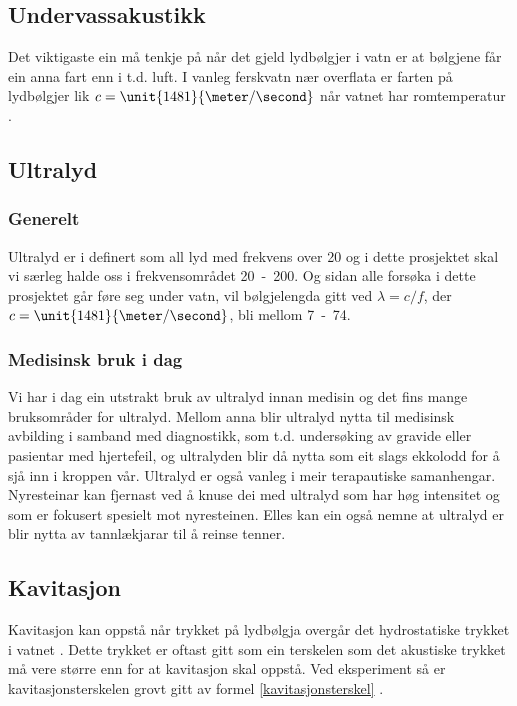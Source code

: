 \subsection{Undervassakustikk}
Det viktigaste ein må tenkje på når det gjeld lydbølgjer i vatn er at bølgjene får ein anna fart enn i t.d. luft. I vanleg ferskvatn nær overflata er farten på lydbølgjer lik $c = \unit{1481}{\meter / \second}$ når vatnet har romtemperatur \cite[s. 630]{citeulike:4412590}.
\subsection{Ultralyd}
\subsubsection*{Generelt}
Ultralyd er i \cite[s. 443]{citeulike:4412590} definert som all lyd med frekvens over \unit{20}{\kilo \hertz} og i dette prosjektet skal vi særleg halde oss i frekvensområdet \unit{20 - 200}{\kilo \hertz}. Og sidan alle forsøka i dette prosjektet går føre seg under vatn, vil bølgjelengda gitt ved $\lambda = c / f$, der $c = \unit{1481}{\meter / \second}$, bli mellom \unit{7 - 74}{\milli\meter}.

\subsubsection*{Medisinsk bruk i dag}
Vi har i dag ein utstrakt bruk av ultralyd innan medisin og det fins mange bruksområder for ultralyd. Mellom anna blir ultralyd nytta til medisinsk avbilding i samband med diagnostikk, som t.d. undersøking av gravide eller pasientar med hjertefeil, og ultralyden blir då nytta som eit slags ekkolodd for å sjå inn i kroppen vår. Ultralyd er også vanleg i meir terapautiske samanhengar. Nyresteinar kan fjernast ved å knuse dei med ultralyd som har høg intensitet og som er fokusert spesielt mot nyresteinen. Elles kan ein også nemne at ultralyd er blir nytta av tannlækjarar til å reinse tenner. 

\subsection{Kavitasjon}
Kavitasjon kan oppstå når trykket på lydbølgja overgår det hydrostatiske trykket i vatnet \cite{Kinsler:2000rc}. Dette trykket er oftast gitt som ein terskelen som det akustiske trykket må vere større enn for at kavitasjon skal oppstå. Ved eksperiment så er kavitasjonsterskelen grovt gitt av formel \eqref{kavitasjonsterskel} \cite{kavitasjon}.

